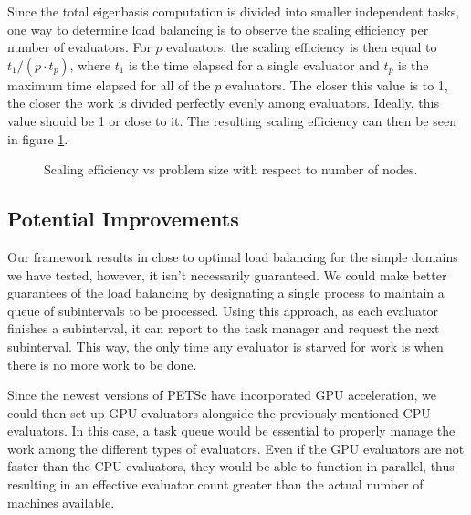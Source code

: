 Since the total eigenbasis computation is divided into smaller independent tasks, one way to determine load balancing is to observe the scaling efficiency per number of evaluators. For $p$ evaluators, the scaling efficiency is then equal to $t_1 / (p\cdot t_p) $, where $t_1$ is the time elapsed for a single evaluator and $t_p$ is the maximum time elapsed for all of the $p$ evaluators. The closer this value is to 1, the closer the work is divided perfectly evenly among evaluators. Ideally, this value should be 1 or close to it. The resulting scaling efficiency can then be seen in figure \ref{fig:efficiency}.

\begin{figure}
	\caption{Scaling efficiency vs problem size with respect to number of nodes.}
	\label{fig:efficiency}
	
\end{figure}

{\color{blue} \noindent <Comparison of performance and accuracy of exact and approximate interval counting> }

\subsection{Potential Improvements}

Our framework results in close to optimal load balancing for the simple domains we have tested, however, it isn't necessarily guaranteed. We could make better guarantees of the load balancing by designating a single process to maintain a queue of subintervals to be processed. Using this approach, as each evaluator finishes a subinterval, it can report to the task manager and request the next subinterval. This way, the only time any evaluator is starved for work is when there is no more work to be done. 

Since the newest versions of PETSc have incorporated GPU acceleration, we could then set up GPU evaluators alongside the previously mentioned CPU evaluators. In this case, a task queue would be essential to properly manage the work among the different types of evaluators. Even if the GPU evaluators are not faster than the CPU evaluators, they would be able to function in parallel, thus resulting in an effective evaluator count greater than the actual number of machines available.